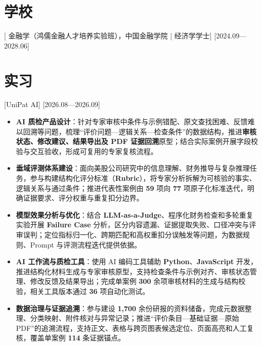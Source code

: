 \documentclass{resume}
\begin{document}

\ResumeTitle

\section{学校}
[{ 金融学（鸿儒金融人才培养实验班），中国金融学院 | 经济学学士}]
[2024.09—2028.06]

\section{实习}

[UniPat AI]
[2026.08—2026.09]
\begin{itemize}
  \item \textbf{AI 质检产品设计}：针对专家审核中条件与示例错配、原文查找困难、反馈难以回溯等问题，梳理“评价问题—逻辑关系—检查条件”的数据结构，推进\textbf{审核状态、修改建议、结果导出及 PDF 证据回溯}原型；结合实际案例开展字段校验与交互验收，形成可复用的专家复核流程。
  \item \textbf{垂域评测体系建设}：面向美股公司研究中的信息理解、财务推导与复杂推理任务，参与构建结构化评分标准（\textbf{Rubric}），将专家分析拆解为可核验的事实、逻辑关系与通过条件；推进代表性案例由 \textbf{59} 项向 \textbf{77} 项原子化标准迭代，明确证据要求、评分权重与重复扣分边界。
  \item \textbf{模型效果分析与优化}：结合 \textbf{LLM-as-a-Judge}、程序化财务检查和多轮重复实验开展 \textbf{Failure Case} 分析，区分内容遗漏、证据提取失败、口径冲突与评审误判；定位指标归一化、跨期匹配和高权重扣分误触发等问题，为数据规则、Prompt 与评测流程迭代提供依据。
  \item \textbf{AI 工作流与质检工具}：使用 AI 编码工具辅助 \textbf{Python}、\textbf{JavaScript} 开发，推进结构化材料生成与专家审核原型，支持检查条件与示例对齐、审核状态管理、修改反馈及结果导出；完成单案例 \textbf{300} 余项审核材料的生成与结构校验，相关工具版本通过 \textbf{36} 项自动化测试。
  \item \textbf{数据治理与证据追溯}：参与建设 \textbf{1,700} 余份研报的资料储备，完成元数据整理、分类映射、附件核对与异常记录；推进“评价条目—基础证据—原始 PDF”的追溯流程，支持正文、表格与跨页图表候选定位、页面高亮和人工复核，覆盖单案例 \textbf{114} 条证据锚点。
\end{itemize}
\end{document}
